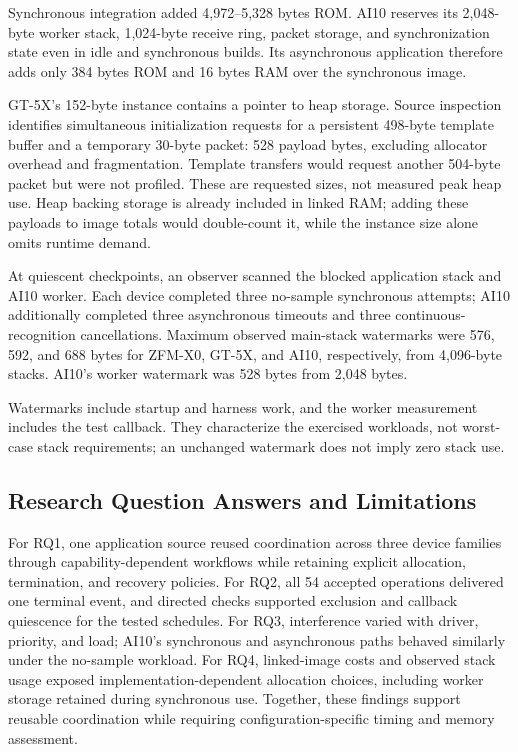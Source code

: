 Synchronous integration added 4,972--5,328 bytes ROM. AI10 reserves its 2,048-byte worker stack, 1,024-byte receive ring, packet storage, and synchronization state even in idle and synchronous builds. Its asynchronous application therefore adds only 384 bytes ROM and 16 bytes RAM over the synchronous image.

GT-5X's 152-byte instance contains a pointer to heap storage. Source inspection identifies simultaneous initialization requests for a persistent 498-byte template buffer and a temporary 30-byte packet: 528 payload bytes, excluding allocator overhead and fragmentation. Template transfers would request another 504-byte packet but were not profiled. These are requested sizes, not measured peak heap use. Heap backing storage is already included in linked RAM; adding these payloads to image totals would double-count it, while the instance size alone omits runtime demand.

At quiescent checkpoints, an observer scanned the blocked application stack and AI10 worker. Each device completed three no-sample synchronous attempts; AI10 additionally completed three asynchronous timeouts and three continuous-recognition cancellations. Maximum observed main-stack watermarks were 576, 592, and 688 bytes for ZFM-X0, GT-5X, and AI10, respectively, from 4,096-byte stacks. AI10's worker watermark was 528 bytes from 2,048 bytes.

Watermarks include startup and harness work, and the worker measurement includes the test callback. They characterize the exercised workloads, not worst-case stack requirements; an unchanged watermark does not imply zero stack use.

\subsection{Research Question Answers and Limitations}
\label{sec:eval_limits}

For RQ1, one application source reused coordination across three device families through capability-dependent workflows while retaining explicit allocation, termination, and recovery policies. For RQ2, all 54 accepted operations delivered one terminal event, and directed checks supported exclusion and callback quiescence for the tested schedules. For RQ3, interference varied with driver, priority, and load; AI10's synchronous and asynchronous paths behaved similarly under the no-sample workload. For RQ4, linked-image costs and observed stack usage exposed implementation-dependent allocation choices, including worker storage retained during synchronous use. Together, these findings support reusable coordination while requiring configuration-specific timing and memory assessment.

